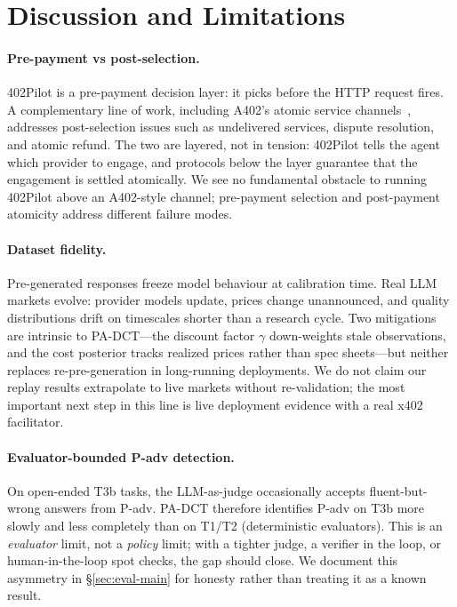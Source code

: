 \section{Discussion and Limitations}
\label{sec:discuss}

\paragraph{Pre-payment vs post-selection.}
402Pilot is a pre-payment decision layer: it picks before the HTTP request fires. A complementary line of work, including A402's atomic service channels~\citep{a402}, addresses post-selection issues such as undelivered services, dispute resolution, and atomic refund. The two are layered, not in tension: 402Pilot tells the agent which provider to engage, and protocols below the layer guarantee that the engagement is settled atomically. We see no fundamental obstacle to running 402Pilot above an A402-style channel; pre-payment selection and post-payment atomicity address different failure modes.

\paragraph{Dataset fidelity.}
Pre-generated responses freeze model behaviour at calibration time. Real LLM markets evolve: provider models update, prices change unannounced, and quality distributions drift on timescales shorter than a research cycle. Two mitigations are intrinsic to PA-DCT—the discount factor $\gamma$ down-weights stale observations, and the cost posterior tracks realized prices rather than spec sheets—but neither replaces re-pre-generation in long-running deployments. We do not claim our replay results extrapolate to live markets without re-validation; the most important next step in this line is live deployment evidence with a real x402 facilitator.

\paragraph{Evaluator-bounded P-adv detection.}
On open-ended T3b tasks, the LLM-as-judge occasionally accepts fluent-but-wrong answers from P-adv. PA-DCT therefore identifies P-adv on T3b more slowly and less completely than on T1/T2 (deterministic evaluators). This is an \emph{evaluator} limit, not a \emph{policy} limit; with a tighter judge, a verifier in the loop, or human-in-the-loop spot checks, the gap should close. We document this asymmetry in \S\ref{sec:eval-main} for honesty rather than treating it as a known result.

